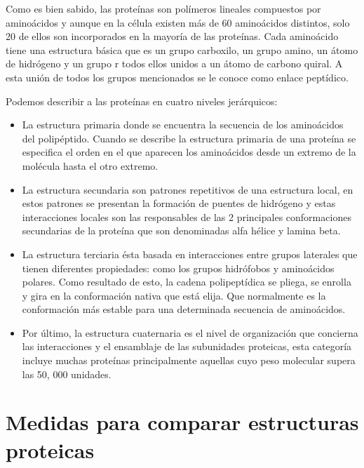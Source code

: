 Como es bien sabido, las prote\'{i}nas son pol\'{i}meros lineales compuestos por amino\'{a}cidos y aunque en la
c\'{e}lula existen m\'{a}s de 60 amino\'{a}cidos distintos, solo 20 de ellos son incorporados en la mayor\'{i}a de las
prote\'{i}nas.
Cada amino\'{a}cido tiene una estructura b\'{a}sica que es un grupo carboxilo, un grupo amino, un \'{a}tomo de
hidr\'{o}geno y un grupo r todos ellos unidos a un \'{a}tomo de carbono quiral. A esta uni\'{o}n de todos los grupos
mencionados se le conoce como enlace pept\'{i}dico.

Podemos describir a las prote\'{i}nas en cuatro niveles jer\'{a}rquicos:

\begin{itemize}

\item La estructura primaria donde se encuentra la secuencia de los
amino\'{a}cidos del polip\'{e}ptido. Cuando se describe la estructura primaria de una prote\'{i}na se especiﬁca el
orden en el que aparecen los amino\'{a}cidos desde un extremo de la mol\'{e}cula hasta el otro extremo.

\item La estructura secundaria son patrones repetitivos de una estructura local, en estos
patrones se presentan la formaci\'{o}n de puentes de hidr\'{o}geno y estas interacciones locales son las
responsables de las 2 principales conformaciones secundarias de la prote\'{i}na que son denominadas alfa
h\'{e}lice y lamina beta.


\item La estructura terciaria \'{e}sta basada en interacciones entre grupos laterales que tienen diferentes
propiedades: como los grupos hidr\'{o}fobos y amino\'{a}cidos polares. Como resultado de esto, la cadena
polipept\'{i}dica se pliega, se enrolla y gira en la conformaci\'{o}n nativa que est\'{a} elija. Que normalmente es la
conformaci\'{o}n m\'{a}s estable para una determinada secuencia de amino\'{a}cidos.


\item Por último, la estructura cuaternaria es el nivel de organizaci\'{o}n que concierna las
interacciones y el ensamblaje de las subunidades proteicas, esta categor\'{i}a incluye muchas prote\'{i}nas
principalmente aquellas cuyo peso molecular supera las 50, 000 unidades.

\end{itemize}

\section{Medidas para comparar estructuras proteicas}

